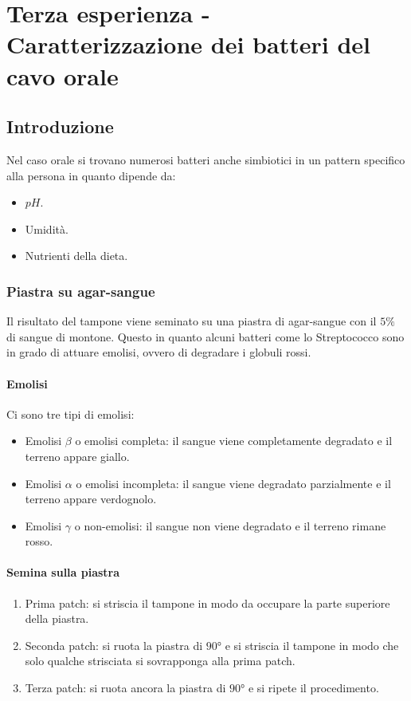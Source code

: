 \section{Terza esperienza - Caratterizzazione dei batteri del cavo orale}

	\subsection{Introduzione}
	Nel caso orale si trovano numerosi batteri anche simbiotici in un pattern specifico alla persona in quanto dipende da:
	\begin{multicols}{3}
		\begin{itemize}
			\item $pH$.
			\item Umidit\`a.
			\item Nutrienti della dieta.
		\end{itemize}
	\end{multicols}
	
		\subsubsection{Piastra su agar-sangue}
		Il risultato del tampone viene seminato su una piastra di agar-sangue con il $5\%$ di sangue di montone. 
		Questo in quanto alcuni batteri come lo Streptococco sono in grado di attuare emolisi, ovvero di degradare i globuli rossi.

			\paragraph{Emolisi}
			Ci sono tre tipi di emolisi:
			\begin{itemize}
				\item Emolisi $\beta$ o emolisi completa: il sangue viene completamente degradato e il terreno appare giallo.
				\item Emolisi $\alpha$ o emolisi incompleta: il sangue viene degradato parzialmente e il terreno appare verdognolo.
				\item Emolisi $\gamma$ o non-emolisi: il sangue non viene degradato e il terreno rimane rosso.
			\end{itemize}

			\paragraph{Semina sulla piastra}
			\begin{enumerate}
				\item Prima patch: si striscia il tampone in modo da occupare la parte superiore della piastra.
				\item Seconda patch: si ruota la piastra di $90\si{\degree}$ e si striscia il tampone in modo che solo qualche strisciata si sovrapponga alla prima patch.
				\item Terza patch: si ruota ancora la piastra di $90\si{\degree}$ e si ripete il procedimento.
			\end{enumerate}

